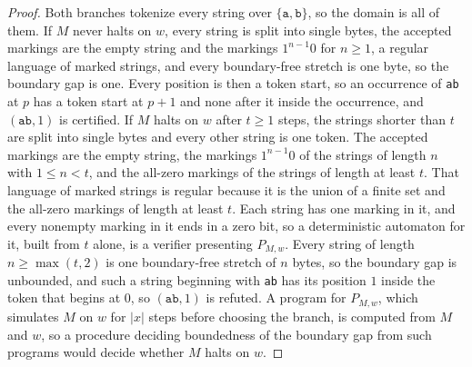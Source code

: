 \documentclass[11pt,a4paper]{article}
\theoremstyle{definition}
\theoremstyle{plain}
\newcommand{\code}[1]{\texttt{#1}}
\begin{document}
\begin{proof}
Both branches tokenize every string over $\{\code{a}, \code{b}\}$, so the domain is all of them. If $M$ never halts on
$w$, every string is split into single bytes, the accepted markings are the empty string and the markings $1^{n-1}0$ for
$n \ge 1$, a regular language of marked strings, and every boundary-free stretch is one byte, so the boundary gap is
one. Every position is then a token start, so an occurrence of \code{ab} at $p$ has a token start at $p+1$ and none
after it inside the occurrence, and $(\code{ab}, 1)$ is certified. If $M$ halts on $w$ after $t \ge 1$ steps, the
strings shorter than $t$ are split into single bytes and every other string is one token. The accepted markings are the
empty string, the markings $1^{n-1}0$ of the strings of length $n$ with $1 \le n < t$, and the all-zero markings of the
strings of length at least $t$. That language of marked strings is regular because it is the union of a finite set and
the all-zero markings of length at least $t$. Each string has one marking in it, and every nonempty marking in it ends
in a zero bit, so a deterministic automaton for it, built from $t$ alone, is a verifier presenting $P_{M,w}$. Every
string of length $n \ge \max(t, 2)$ is one boundary-free stretch of $n$ bytes, so the boundary gap is unbounded, and
such a string beginning with \code{ab} has its position $1$ inside the token that begins at $0$, so $(\code{ab}, 1)$ is
refuted. A program for $P_{M,w}$, which simulates $M$ on $w$ for $|x|$ steps before choosing the branch, is computed
from $M$ and $w$, so a procedure deciding boundedness of the boundary gap from such programs would decide whether $M$
halts on $w$.
\end{proof}
\end{document}
